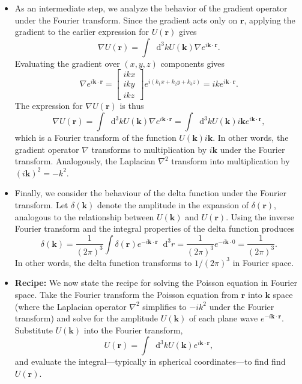 \documentclass[11pt, a4paper]{article}
\newcommand{\diff}{\mathop{}\!\mathrm{d}} %
\renewcommand{\vec}[1]{\bm{#1}} %
\renewcommand{\r}{\vec{r}}
\renewcommand{\grad}{\nabla}
\renewcommand{\laplacian}{\nabla^{2}}
\begin{document}
\begin{itemize}
    \item As an intermediate step, we analyze the behavior of the gradient operator under the Fourier transform. Since the gradient acts only on $ \r $, applying the gradient to the earlier expression for $ U(\r) $ gives
	\begin{equation*}
		\grad U(\r) = \int \diff^{3}k U(\vec{k}) \grad e^{i \vec{k}\cdot \r}.
	\end{equation*}
	Evaluating the gradient over $ (x, y, z) $ components gives
	\begin{equation*}
		\grad e^{i \vec{k}\cdot \r} = 
		\begin{bmatrix}
			ikx\\
			iky\\
			ikz
		\end{bmatrix}
		e^{i(k_{1}x + k_{2}y + k_{3}z)} = ik e^{i\vec{k}\cdot \r}.
	\end{equation*}
    The expression for $ \grad U(\r) $ is thus
	\begin{equation*}
		\grad U(\r) = \int \diff^{3}k U(\vec{k}) \grad e^{i \vec{k}\cdot \r} = \int \diff^{3}k U(\vec{k})i \vec{k} e^{i \vec{k}\cdot \r},
	\end{equation*}
	which is a Fourier transform of the function $ U(\vec{k})i \vec{k} $. In other words, the gradient operator $ \grad $ transforms to multiplication by $ i\vec{k} $ under the Fourier transform. Analogously, the Laplacian $ \nabla^{2} $ transform into multiplication by $ (i\vec{k})^{2} = - k^{2} $. 
	
	\item Finally, we consider the behaviour of the delta function under the Fourier transform. Let $ \delta(\vec{k}) $ denote the amplitude in the expansion of $ \delta(\r) $, analogous to the relationship between $ U(\vec{k}) $ and $ U(\r) $. Using the inverse Fourier transform and the integral properties of the delta function produces
	\begin{equation*}
		\delta (\vec{k}) = \frac{1}{(2\pi)^{3}} \int \delta(\r) e^{-i\vec{k}\cdot\r}\diff^{3}r = \frac{1}{(2\pi)^{3}} e^{-i\vec{k}\cdot 0} = \frac{1}{(2\pi)^{3}}.
	\end{equation*}
    In other words, the delta function transforms to $ 1/(2\pi)^{3} $ in Fourier space.
	
	\item \textbf{Recipe:} We now state the recipe for solving the Poisson equation in Fourier space. Take the Fourier transform the Poisson equation from $ \r $ into $ \vec{k} $ space (where the Laplacian operator $ \laplacian $ simplifies to $ -ik^{2} $ under the Fourier transform) and solve for the amplitude $ U(\vec{k}) $ of each plane wave $ e^{-i\vec{k}\cdot \r} $. Substitute $ U(\vec{k}) $ into the Fourier transform,
	\begin{equation*}
		U(\r) = \int \diff^{3}k U(\vec{k}) e^{i \vec{k}\cdot \r},
	\end{equation*}
	and evaluate the integral---typically in spherical coordinates---to find find $ U(\r) $. 
	
	
    
\end{itemize}
\end{document}
